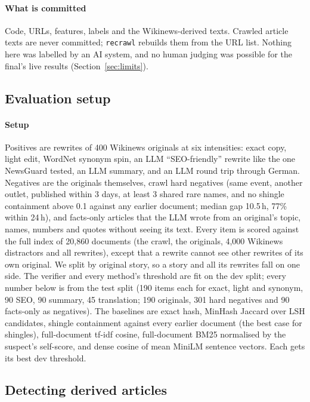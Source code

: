 \documentclass[11pt,a4paper]{article}
\newcommand{\code}[1]{\texttt{#1}}
\begin{document}
\paragraph{What is committed} Code, URLs, features, labels and the Wikinews-derived texts. Crawled article texts are never committed; \code{recrawl} rebuilds them from the URL list. Nothing here was labelled by an AI system, and no human judging was possible for the final's live results (Section~\ref{sec:limits}).

\subsection{Evaluation setup}

\paragraph{Setup} Positives are rewrites of 400 Wikinews originals at six intensities: exact copy, light edit, WordNet synonym spin, an LLM ``SEO-friendly'' rewrite like the one NewsGuard tested, an LLM summary, and an LLM round trip through German. Negatives are the originals themselves, crawl hard negatives (same event, another outlet, published within 3 days, at least 3 shared rare names, and no shingle containment above 0.1 against any earlier document; median gap 10.5\,h, 77\% within 24\,h), and facts-only articles that the LLM wrote from an original's topic, names, numbers and quotes without seeing its text. Every item is scored against the full index of 20,860 documents (the crawl, the originals, 4,000 Wikinews distractors and all rewrites), except that a rewrite cannot see other rewrites of its own original. We split by original story, so a story and all its rewrites fall on one side. The verifier and every method's threshold are fit on the dev split; every number below is from the test split (190 items each for exact, light and synonym, 90 SEO, 90 summary, 45 translation; 190 originals, 301 hard negatives and 90 facts-only as negatives). The baselines are exact hash, MinHash Jaccard over LSH candidates, shingle containment against every earlier document (the best case for shingles), full-document tf-idf cosine, full-document BM25 normalised by the suspect's self-score, and dense cosine of mean MiniLM sentence vectors. Each gets its best dev threshold.

\subsection{Detecting derived articles}
\end{document}
